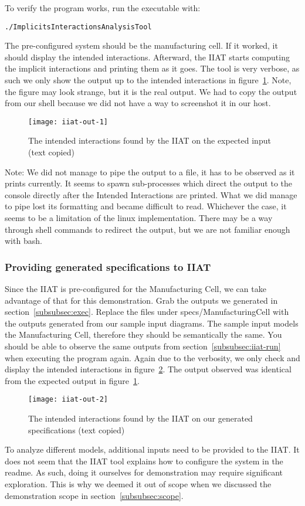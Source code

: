To verify the program works, run the executable with:
\begin{verbatim}./ImplicitsInteractionsAnalysisTool\end{verbatim}
The pre-configured system should be the manufacturing cell.
If it worked, it should display the intended interactions.
Afterward, the IIAT starts computing the implicit interactions and printing them as it goes.
The tool is very verbose, as such we only show the output up to the intended interactions in figure~\ref{fig:iiat-out}.
Note, the figure may look strange, but it is the real output.
We had to copy the output from our shell because we did not have a way to screenshot it in our host.
\begin{figure}[h]
    \centering
    \texttt{[image: iiat-out-1]}
    \caption{The intended interactions found by the IIAT on the expected input (text copied)}
    \label{fig:iiat-out}
\end{figure}

Note: We did not manage to pipe the output to a file, it has to be observed as it prints currently.
It seems to spawn sub-processes which direct the output to the console directly after the Intended Interactions are printed.
What we did manage to pipe lost its formatting and became difficult to read.
Whichever the case, it seems to be a limitation of the linux implementation.
There may be a way through shell commands to redirect the output, but we are not familiar enough with bash.

\subsubsection{Providing generated specifications to IIAT}
Since the IIAT is pre-configured for the Manufacturing Cell,
we can take advantage of that for this demonstration.
Grab the outputs we generated in section~\ref{subsubsec:exec}.
Replace the files under specs/ManufacturingCell with the outputs generated from our sample input diagrams.
The sample input models the Manufacturing Cell, therefore they should be semantically the same.
You should be able to observe the same outputs from section~\ref{subsubsec:iiat-run} when executing the program again.
Again due to the verbosity, we only check and display the intended interactions in figure~\ref{fig:iiat-out2}.
The output observed was identical from the expected output in figure~\ref{fig:iiat-out}.
\begin{figure}[h]
    \centering
    \texttt{[image: iiat-out-2]}
    \caption{The intended interactions found by the IIAT on our generated specifications (text copied)}
    \label{fig:iiat-out2}
\end{figure}
To analyze different models, additional inputs need to be provided to the IIAT\@.
It does not seem that the IIAT tool explains how to configure the system in the readme.
As such, doing it ourselves for demonstration may require significant exploration.
This is why we deemed it out of scope when we discussed the demonstration scope in section~\ref{subsubsec:scope}.